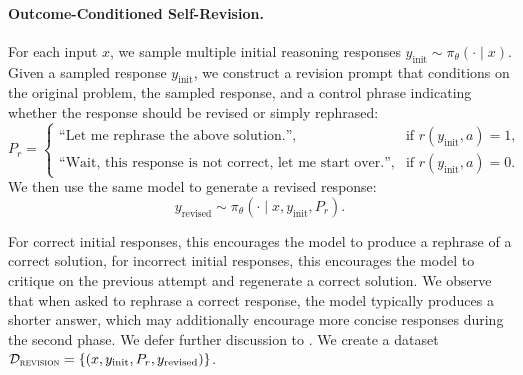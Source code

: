 
 


\paragraph{Outcome-Conditioned Self-Revision.}
For each input $x$, we sample multiple initial reasoning responses $y_\text{init} \sim \pi_\theta(\cdot \mid x)$. Given a sampled response $y_\text{init}$, we construct a revision prompt that conditions on the original problem, the sampled response, and a control phrase indicating whether the response should be revised or simply rephrased: 
\[
P_{r} =
\begin{cases}
\text{``Let me rephrase the above solution.''}, & \text{if } r(y_\text{init},a)=1, \\
\text{``Wait, this response is not correct, let me start over.''}, & \text{if }  r(y_\text{init},a)=0.
\end{cases}
\]
We then use the same model to generate a revised response:
\[
y_\text{revised} \sim \pi_\theta(\cdot \mid x, y_\text{init}, P_{r}).
\]

For correct initial responses, this encourages the model to produce a rephrase of a correct solution, for incorrect initial responses, this encourages the model to critique on the previous attempt and regenerate a correct solution. We observe that when asked to rephrase a correct response, the model typically produces a shorter answer, which may additionally encourage more concise responses during the second phase. We defer further discussion to . We create a dataset $\mathcal{D}_{\textsc{revision}} =  \{(x,y_\text{init},P_r, y_\text{revised})\}$.

